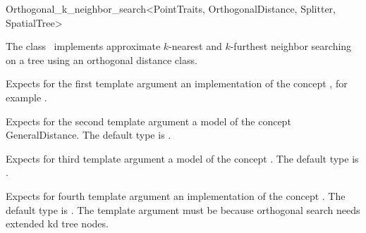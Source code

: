 

\begin{ccRefClass}{Orthogonal_k_neighbor_search<PointTraits, OrthogonalDistance, Splitter, SpatialTree>}


\ccDefinition

The class \ccRefName\ implements approximate $k$-nearest and
$k$-furthest neighbor searching  on a tree
using an orthogonal distance class.


\ccParameters

Expects for the first template argument an implementation of the concept ,
for example .

Expects for the second template argument a model of the
concept GeneralDistance. The default type is 
.

Expects for third template argument a model of the concept .
The default type is .

Expects for fourth template argument an implementation of the concept .
The default type is .  The 
template argument must be  because orthogonal search needs extended 
kd tree nodes.

\ccTypes





\end{ccRefClass}

